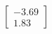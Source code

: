 \documentclass[preview]{standalone}
\begin{document}
\begin{align*}
\begin{bmatrix} -3.69 \\ 1.83 \end{bmatrix}
\end{align*}
\end{document}
